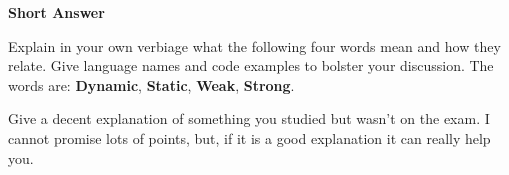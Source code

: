 \documentclass[12pt, addpoints, answers]{exam}
\begin{document}
\begin{questions}
				


\newpage 
\Huge 
\hspace{-1.5cm}
\textbf{Short Answer}\\
\normalsize 



\question Explain in your own verbiage what the following four words mean and how they relate. Give language names and code examples to bolster your discussion. The words are: \textbf{Dynamic}, \textbf{Static}, \textbf{Weak}, \textbf{Strong}. \


\question Give a decent explanation of something you studied but wasn't on the exam. I cannot promise lots of points, but, if it is a good explanation it can really help you. 

	
    
\end{questions}
\end{document}
